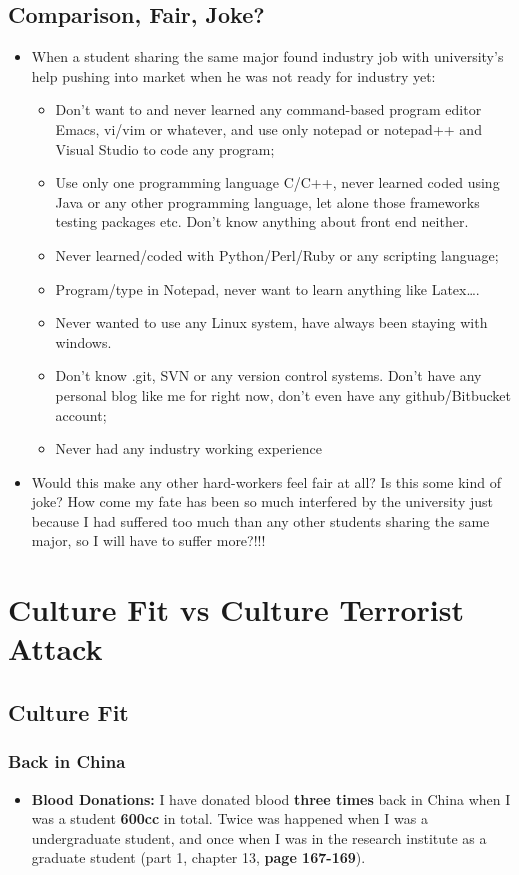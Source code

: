 \documentclass[9pt,b5paper]{article}
\begin{document}
\subsection{Comparison, Fair, Joke?}
\label{sec-11-1}
\begin{itemize}
\item When a student sharing the same major found industry job with university's help pushing into market when he was not ready for industry yet:
\begin{itemize}
\item Don't want to and never learned any command-based program editor Emacs, vi/vim or whatever, and use only notepad or notepad++ and Visual Studio to code any program;
\item Use only one programming language C/C++, never learned coded using Java or any other programming language, let alone those frameworks testing packages etc. Don't know anything about front end neither.
\item Never learned/coded with Python/Perl/Ruby or any scripting language;
\item Program/type in Notepad, never want to learn anything like Latex\ldots{}.
\item Never wanted to use any Linux system, have always been staying with windows.
\item Don't know .git, SVN or any version control systems. Don't have any personal blog like me for right now, don't even have any github/Bitbucket account;
\item Never had any industry working experience
\end{itemize}
\item Would this make any other hard-workers feel fair at all? Is this some kind of joke? How come my fate has been so much interfered by the university just because I had suffered too much than any other students sharing the same major, so I will have to suffer more?!!!
\end{itemize}

\section{Culture Fit vs Culture Terrorist Attack}
\label{sec-12}
\subsection{Culture Fit}
\label{sec-12-1}
\subsubsection{Back in China}
\label{sec-12-1-1}
\begin{itemize}
\item \textbf{Blood Donations:} I have donated blood \textbf{three times} back in China when I was a student \textbf{600cc} in total. Twice was happened when I was a undergraduate student, and once when I was in the research institute as a graduate student (part 1, chapter 13, \textbf{page 167-169}).
\end{itemize}
\end{document}
